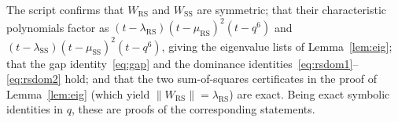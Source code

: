 \documentclass[11pt]{article}
\theoremstyle{definition}
\theoremstyle{remark}
\newcommand{\norm}[1]{\left\lVert #1 \right\rVert}
\newcommand{\Wss}{W_{\mathrm{SS}}}
\newcommand{\Wrs}{W_{\mathrm{RS}}}
\begin{document}
\noindent The script confirms that $\Wrs$ and $\Wss$ are symmetric; that their characteristic
polynomials factor as $(t-\lambda_{\mathrm{RS}})(t-\mu_{\mathrm{RS}})^2(t-q^6)$ and
$(t-\lambda_{\mathrm{SS}})(t-\mu_{\mathrm{SS}})^2(t-q^6)$, giving the eigenvalue lists of
Lemma~\ref{lem:eig}; that the gap identity~\eqref{eq:gap} and the dominance
identities~\eqref{eq:rsdom1}--\eqref{eq:rsdom2} hold; and that the two sum-of-squares
certificates in the proof of Lemma~\ref{lem:eig} (which yield $\norm{\Wrs}=\lambda_{\mathrm{RS}}$)
are exact. Being exact symbolic identities in $q$, these are proofs of the corresponding statements.
\end{document}
